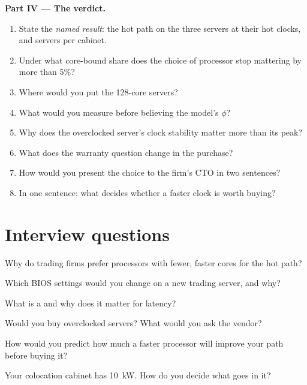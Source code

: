 \begin{problem}
\medskip\noindent\textbf{Part IV --- The verdict.}
\begin{enumerate}[resume]
\item State the \emph{named result}: the hot path on the three servers at their hot clocks, and servers per cabinet.
\item Under what core-bound share does the choice of processor stop mattering by more than 5\%?
\item Where would you put the 128-core servers?
\item What would you measure before believing the model's $\phi$?
\item Why does the overclocked server's clock stability matter more than its peak?
\item What does the warranty question change in the purchase?
\item How would you present the choice to the firm's CTO in two sentences?
\item In one sentence: what decides whether a faster clock is worth buying?
\end{enumerate}
\end{problem}

\section{Interview questions}

\begin{interviewq}\label{iq:nw:servers:1}
Why do trading firms prefer processors with fewer, faster cores for the hot path?
\end{interviewq}

\begin{interviewq}\label{iq:nw:servers:2}
Which BIOS settings would you change on a new trading server, and why?
\end{interviewq}

\begin{interviewq}\label{iq:nw:servers:3}
What is a  and why does it matter for latency?
\end{interviewq}

\begin{interviewq}\label{iq:nw:servers:4}
Would you buy overclocked servers? What would you ask the vendor?
\end{interviewq}

\begin{interviewq}\label{iq:nw:servers:5}
How would you predict how much a faster processor will improve your path before buying it?
\end{interviewq}

\begin{interviewq}\label{iq:nw:servers:6}
Your colocation cabinet has \qty{10}{\kilo\watt}. How do you decide what goes in it?
\end{interviewq}
